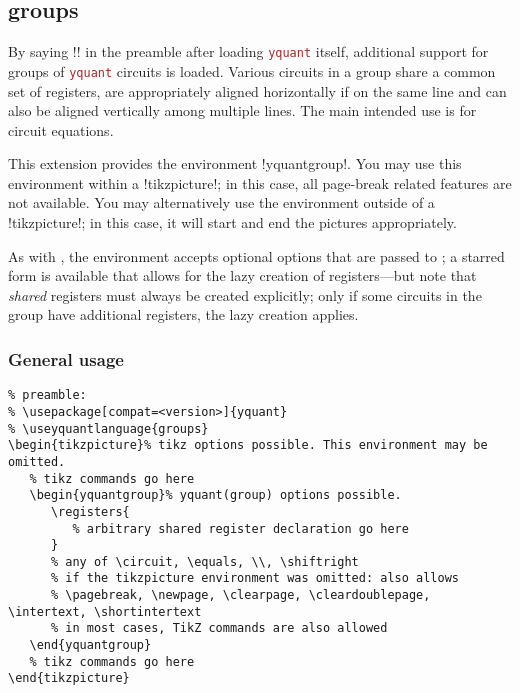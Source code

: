 \documentclass{scrartcl}
\def\pkg#1{\textcolor{brown}{\texttt{#1}}}
\def\texlink{\link\tex}
\def\Yquant{\pkg{yquant}}
\begin{document}
      \subsection[groups]{groups}\label{sec:foreign:groups}
         By saying \tex!! in the preamble after loading \Yquant{} itself, additional support for groups of \Yquant{} circuits is loaded.
         Various circuits in a group share a common set of registers, are appropriately aligned horizontally if on the same line and can also be aligned vertically among multiple lines.
         The main intended use is for circuit equations.

         This extension provides the environment \tex!yquantgroup!.
         You may use this environment within a \tex!tikzpicture!; in this case, all page\hyp break related features are not available.
         You may alternatively use the environment outside of a \tex!tikzpicture!; in this case, it will start and end the pictures appropriately.

         As with \texlink{yquant}, the environment accepts optional options that are passed to \texlink\yquantset; a starred form is available that allows for the lazy creation of registers---but note that \emph{shared} registers must always be created explicitly; only if some circuits in the group have additional registers, the lazy creation applies.

         \subsubsection{General usage}\vskip-2mm
            \begin{verbatim}
% preamble:
% \usepackage[compat=<version>]{yquant}
% \useyquantlanguage{groups}
\begin{tikzpicture}% tikz options possible. This environment may be omitted.
   % tikz commands go here
   \begin{yquantgroup}% yquant(group) options possible.
      \registers{
         % arbitrary shared register declaration go here
      }
      % any of \circuit, \equals, \\, \shiftright
      % if the tikzpicture environment was omitted: also allows
      % \pagebreak, \newpage, \clearpage, \cleardoublepage, \intertext, \shortintertext
      % in most cases, TikZ commands are also allowed
   \end{yquantgroup}
   % tikz commands go here
\end{tikzpicture}
            \end{verbatim}
\end{document}
